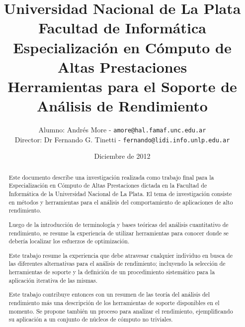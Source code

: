 \documentclass[a4paper]{report}
\begin{document}
\title{Universidad Nacional de La Plata\\Facultad de Inform\'atica\\ \bigskip
  Especializaci\'on en C\'omputo de Altas Prestaciones\\ \bigskip
  Herramientas para el Soporte de An\'alisis de Rendimiento}

\author{
  Alumno: Andr\'es More - {\tt amore@hal.famaf.unc.edu.ar}\\
  Director: Dr Fernando G. Tinetti - {\tt fernando@lidi.info.unlp.edu.ar}
}

\date{Diciembre de 2012}

\maketitle

\begin{abstract}

  Este documento describe una investigaci\'on realizada como trabajo final para
  la Especializaci\'on en C\'omputo de Altas Prestaciones dictada en la
  Facultad de Inform\'atica de la Universidad Nacional de La Plata.
  El tema de investigaci\'on consiste en m\'etodos y herramientas para
  el an\'alisis del comportamiento de aplicaciones de alto rendimiento.

  \bigskip

  Luego de la introducci\'on de terminolog\'ia y bases te\'oricas del
  an\'alisis cuantitativo de rendimiento, se resume la experiencia de utilizar
  herramientas para conocer donde se deber\'ia localizar los esfuerzos de
  optimizaci\'on.

  \bigskip

  Este trabajo resume la experiencia que debe atravesar cualquier
  individuo en busca de las diferentes alternativas para el an\'alisis de
  rendimiento; incluyendo la selecci\'on de herramientas de soporte y la
  definici\'on de un procedimiento sistem\'atico para la aplicaci\'on iterativa
  de las mismas.

  \bigskip

  Este trabajo contribuye entonces con un resumen de las teor\'ia del an\'alisis del
  rendimiento m\'as una descripci\'on de los herramientas de soporte 
  disponibles en el momento. Se propone tambi\'en un proceso para analizar el
  rendimiento, ejemplificando su aplicaci\'on a un conjunto de n\'ucleos de
  c\'omputo no triviales.

\end{abstract}
\end{document}
